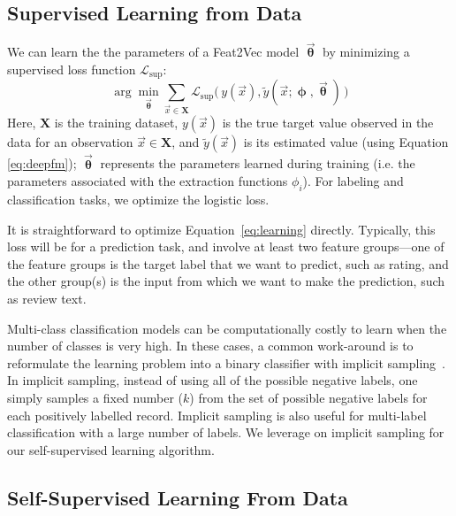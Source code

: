 \documentclass[letterpaper]{article}
\newcommand{\vect}[1]{\vec{#1}}
\begin{document}
\subsection{Supervised Learning from Data}
\label{sec:learning_supervised}

We can learn the the parameters of a Feat2Vec model $  \vect{\bm\uptheta}$  by minimizing a supervised loss function $\mathcal L_\text{sup}$:
\label{sec:learning}
\begin{equation}
\arg \min_{ \vect{\bm\uptheta}} \sum_{\vect{x} \in \mathbf{X}}  \mathcal{L}_\text{sup}\bigl( \, y(\vect{x}), \tilde y(\vect{x};{\bm \upphi,  \vect{\bm\uptheta}}) \, \bigr)
\label{eq:learning}
\end{equation}
Here, $\mathbf X$ is the training dataset, $y(\vect{x})$  is the true target value observed in the data for an observation $\vect{x} \in \mathbf{X}$, and $\tilde {y}(\vect{x})$ is its estimated value (using Equation \ref{eq:deepfm});
$ \vect{\bm\uptheta}$ represents the parameters learned  during training (i.e. the parameters associated with the extraction functions $\phi_i$).
For labeling and classification tasks, we optimize the logistic loss.

It is straightforward to optimize Equation~\ref{eq:learning} directly.
Typically, this loss will be for a prediction task, and involve at least two feature groups---one of the feature groups is the target label that we want to predict, such as rating, and the other group(s) is the input from which we want to make the prediction, such as review text.

Multi-class classification models can be computationally costly to learn when the number of classes is very high.
In these cases, a common work-around is to  reformulate the learning problem into a binary classifier with implicit sampling~\cite{samplingnotes}.
In implicit sampling, instead of using all of the possible negative labels, one simply samples a fixed number ($k$) from the set of possible negative labels for each positively labelled record.
Implicit sampling is also useful for multi-label classification with a large number of labels. 
We leverage on implicit sampling for our self-supervised learning algorithm.

\subsection{Self-Supervised Learning From Data}
\label{sec:sampling}
\end{document}

